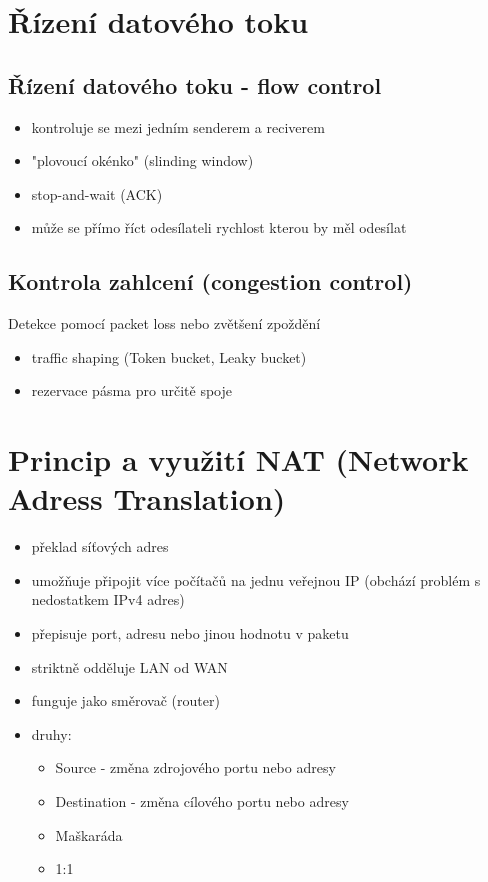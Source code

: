 \documentclass{szzclass}
\providecommand{\tightlist}{%
  \setlength{\itemsep}{0pt}\setlength{\parskip}{0pt}}
\begin{document}
\hypertarget{ux159uxedzenuxed-datovuxe9ho-toku}{%
\section{Řízení datového
toku}\label{ux159uxedzenuxed-datovuxe9ho-toku}}
\subsection{Řízení datového toku - flow control}
\begin{itemize}
  \item kontroluje se mezi jedním senderem a reciverem
  \item "plovoucí okénko" (slinding window)
  \item stop-and-wait (ACK)
  \item může se přímo říct odesílateli rychlost kterou by měl odesílat
\end{itemize}
\subsection{Kontrola zahlcení (congestion control)}
Detekce pomocí packet loss nebo zvětšení zpoždění
\begin{itemize}
  \item traffic shaping (Token bucket, Leaky bucket)
  \item rezervace pásma pro určitě spoje
\end{itemize}

\hypertarget{princip-a-vyuux17eituxed-nat-network-adress-translation}{%
\section{Princip a využití NAT (Network Adress
Translation)}\label{princip-a-vyuux17eituxed-nat-network-adress-translation}}

\begin{itemize}
\tightlist
\item
  překlad síťových adres
\item
  umožňuje připojit více počítačů na jednu veřejnou IP (obchází problém
  s nedostatkem IPv4 adres)
\item
  přepisuje port, adresu nebo jinou hodnotu v paketu
\item 
  striktně odděluje LAN od WAN
\item 
  funguje jako směrovač (router)
\item
  druhy:

  \begin{itemize}
  \tightlist
  \item
    Source - změna zdrojového portu nebo adresy
  \item
    Destination - změna cílového portu nebo adresy
  \item
    Maškaráda
  \item
    1:1
  \end{itemize}
\end{itemize}
\end{document}
